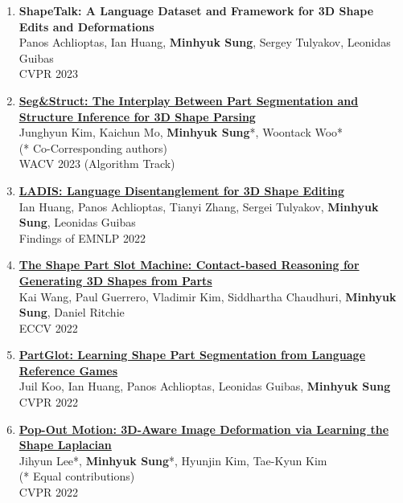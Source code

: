 \documentclass[letterpaper,10pt]{article} %
\newcommand{\blankline}{\quad\pagebreak[2]}
\begin{document}
{\begin{enumerate}
\item \label{cvpr23_1}
\textbf{ShapeTalk: A Language Dataset and Framework for 3D Shape Edits and Deformations}\\
Panos Achlioptas, Ian Huang, \textbf{Minhyuk Sung}, Sergey Tulyakov, Leonidas Guibas\\
CVPR 2023\\
\blankline

\item \label{wacv23}
\href{https://arxiv.org/abs/2212.05011}{\textbf{Seg\&Struct: The Interplay Between Part Segmentation and Structure Inference for 3D Shape Parsing}}\\
Junghyun Kim, Kaichun Mo, \textbf{Minhyuk Sung}*, Woontack Woo*\\
(* Co-Corresponding authors)\\
WACV 2023 (Algorithm Track)\\
\blankline

\item \label{emnlp22}
\href{https://arxiv.org/abs/2212.05011}{\textbf{LADIS: Language Disentanglement for 3D Shape Editing}}\\
Ian Huang, Panos Achlioptas, Tianyi Zhang, Sergei Tulyakov, \textbf{Minhyuk Sung}, Leonidas Guibas \\
Findings of EMNLP 2022\\
\blankline

\item \label{eccv22}
\href{https://arxiv.org/abs/2112.00584}{\textbf{The Shape Part Slot Machine: Contact-based Reasoning for Generating 3D Shapes from Parts}}\\
Kai Wang, Paul Guerrero, Vladimir Kim, Siddhartha Chaudhuri, \textbf{Minhyuk Sung}, Daniel Ritchie\\
ECCV 2022\\
\blankline

\item \label{cvpr22_2}
\href{https://arxiv.org/abs/2112.06390}{\textbf{PartGlot: Learning Shape Part Segmentation from Language Reference Games}}\\
Juil Koo, Ian Huang, Panos Achlioptas, Leonidas Guibas, \textbf{Minhyuk Sung}\\
CVPR 2022\\
\blankline

\item \label{cvpr22_2}
\href{https://arxiv.org/abs/2203.15235}{\textbf{Pop-Out Motion: 3D-Aware Image Deformation via Learning the Shape Laplacian}}\\
Jihyun Lee*, \textbf{Minhyuk Sung}*, Hyunjin Kim, Tae-Kyun Kim\\
(* Equal contributions)\\
CVPR 2022\\
\blankline


\end{enumerate}}
\end{document}
